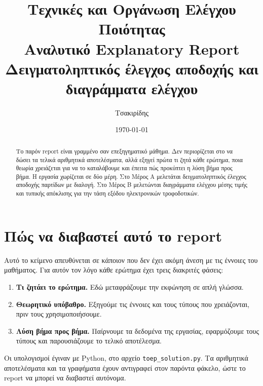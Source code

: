 \documentclass[12pt,a4paper]{article}
\title{
    \textbf{Τεχνικές και Οργάνωση Ελέγχου Ποιότητας}\\[0.25cm]
    \Large Αναλυτικό Explanatory Report\\[0.15cm]
    \large Δειγματοληπτικός έλεγχος αποδοχής και διαγράμματα ελέγχου
}
\author{Τσακιρίδης}
\date{\today}
\newcommand{\code}[1]{\texttt{\textenglish{#1}}}
\begin{document}
\maketitle
\thispagestyle{fancy}

\begin{abstract}
Το παρόν report είναι γραμμένο σαν επεξηγηματικό μάθημα. Δεν περιορίζεται στο
να δώσει τα τελικά αριθμητικά αποτελέσματα, αλλά εξηγεί πρώτα τι ζητά κάθε
ερώτημα, ποια θεωρία χρειάζεται για να το καταλάβουμε και έπειτα πώς
προκύπτει η λύση βήμα προς βήμα. Η εργασία χωρίζεται σε δύο μέρη. Στο Μέρος Α
μελετάται δειγματοληπτικός έλεγχος αποδοχής παρτίδων με διαλογή. Στο Μέρος Β
μελετώνται διαγράμματα ελέγχου μέσης τιμής και τυπικής απόκλισης για την τάση
εξόδου ηλεκτρονικών τροφοδοτικών.
\end{abstract}

\tableofcontents
\newpage

\section*{Πώς να διαβαστεί αυτό το report}

Αυτό το κείμενο απευθύνεται σε κάποιον που δεν έχει ακόμη άνεση με τις έννοιες
του μαθήματος. Για αυτόν τον λόγο κάθε ερώτημα έχει τρεις διακριτές φάσεις:

\begin{enumerate}
    \item \textbf{Τι ζητάει το ερώτημα.} Εδώ μεταφράζουμε την εκφώνηση σε απλή
    γλώσσα.
    \item \textbf{Θεωρητικό υπόβαθρο.} Εξηγούμε τις έννοιες και τους τύπους
    που χρειάζονται, πριν τους χρησιμοποιήσουμε.
    \item \textbf{Λύση βήμα προς βήμα.} Παίρνουμε τα δεδομένα της εργασίας,
    εφαρμόζουμε τους τύπους και παρουσιάζουμε το τελικό αποτέλεσμα.
\end{enumerate}

Οι υπολογισμοί έγιναν με Python, στο αρχείο \code{toep\_solution.py}. Τα
αριθμητικά αποτελέσματα και τα γραφήματα έχουν αντιγραφεί στον παρόντα φάκελο,
ώστε το report να μπορεί να διαβαστεί αυτόνομα.

\newpage

\end{document}
